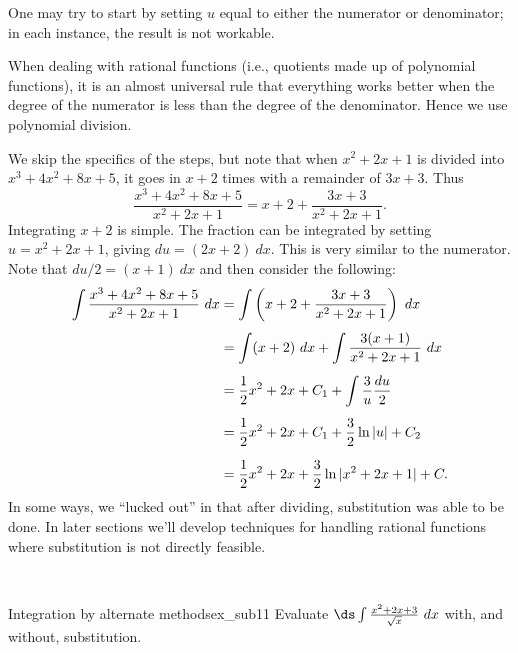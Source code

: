 \begin{solution}
{One may try to start by setting $u$ equal to either the numerator or denominator; in each instance, the result is not workable. 

When dealing with rational functions (i.e., quotients made up of polynomial functions), it is an almost universal rule that everything works better when the degree of the numerator is less than the degree of the denominator. Hence we use polynomial division.

We skip the specifics of the steps, but note that when $x^2+2x+1$ is divided into $x^3+4x^2+8x+5$, it goes in $x+2$ times with a remainder of $3x+3$. Thus 
	$$\frac{x^3+4x^2+8x+5}{x^2+2x+1} = x+2 + \frac{3x+3}{x^2+2x+1}.$$
Integrating $x+2$ is simple. The fraction can be integrated by setting $u = x^2+2x+1$, giving $du = (2x+2)\ dx$. This is very similar to the numerator. Note that $du/2 = (x+1)\ dx$ and then consider the following:
\begin{align*}
\int \frac{x^3+4x^2+8x+5}{x^2+2x+1}\ dx & = \int \left(x+2 + \frac{3x+3}{x^2+2x+1}\right)\ dx  \rule[-13pt]{0pt}{5pt} \\
					&= \int (x+2)\ dx + \int \frac{3(x+1)}{x^2+2x+1}\ dx  \rule[-13pt]{0pt}{5pt}\\
					& = \frac12x^2+2x+C_1 + \int \frac{3}{u}\frac{du}{2}  \rule[-13pt]{0pt}{5pt}\\
					&= \frac12x^2+2x+C_1 + \frac32\ln|u| + C_2 \rule[-13pt]{0pt}{5pt}\\
					&= \frac12x^2+2x+\frac32\ln|x^2+2x+1| + C.
\end{align*}
In some ways, we ``lucked out'' in that after dividing, substitution was able to be done. In later sections we'll develop techniques for handling rational functions where substitution is not directly feasible.
}\\
\end{solution}


\begin{example}{Integration by alternate methods}{ex_sub11}
{
Evaluate $\ds\int \frac{x^2+2x+3}{\sqrt{x}}\ dx$ with, and without, substitution.}
\end{example}


